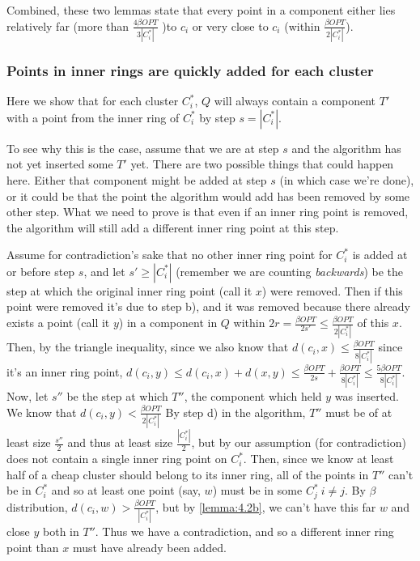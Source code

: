 \documentclass[paper=a4, fontsize=10.5pt]{scrartcl} %
\numberwithin{equation}{section} %
\numberwithin{figure}{section} %
\numberwithin{table}{section} %
\begin{document}
Combined, these two lemmas state that every point in a component either lies relatively far (more than $\frac{4 \beta OPT}{3 |C^*_i|}$ )to $c_i$ or very close to $c_i$ (within $\frac{\beta OPT}{2 |C^*_i|}$).  


\subsubsection{Points in inner rings are quickly added for each cluster}

Here we show that for each cluster $C^*_i$, $Q$ will always contain a component $T'$ with a point from the inner ring of $C^*_i$ by step $s = |C^*_i|$.

To see why this is the case, assume that we are at step $s$ and the algorithm has not yet inserted some $T'$ yet.  There are two possible things that could happen here.  Either that component might be added at step $s$ (in which case we're done), or it could be that the point the algorithm would add has been removed by some other step.  What we need to prove is that even if an inner ring point is removed, the algorithm will still add a different inner ring point at this step.

Assume for contradiction's sake that no other inner ring point for $C^*_i$ is added at or before step $s$, and let $s' \geq |C^*_i|$ (remember we are counting \emph{backwards}) be the step at which the original inner ring point (call it $x$) were removed.  Then if this point were removed it's due to step b), and it was removed because there already exists a point (call it $y$) in a component in $Q$ within $2r = \frac{\beta OPT}{2s'} \leq \frac{\beta OPT}{2|C^*_i|}$ of this $x$.  Then, by the triangle inequality, since we also know that $d(c_i, x) \leq \frac{\beta OPT}{8 |C^*_i|}$ since it's an inner ring point,  $d(c_i, y) \leq d(c_i, x) + d(x, y) \leq \frac{\beta OPT}{2s} + \frac{\beta OPT}{8 |C^*_i|} \leq \frac{5 \beta OPT}{8 |C^*_i|}$.  Now, let $s''$ be the step at which $T''$, the component which held $y$ was inserted.  We know that $d(c_i, y) < \frac{\beta OPT}{2 |C^*_i|}$   By step d) in the algorithm, $T''$ must be of at least size $\frac{s''}{2}$ and thus at least size $\frac{|C^*_i|}{2}$, but by our assumption (for contradiction) does not contain a single inner ring point on $C^*_i$.  Then, since we know at least half of a cheap cluster should belong to its inner ring, all of the points in $T''$ can't be in $C^*_i$ and so at least one point (say, $w$) must be in some $C^*_j~i \neq j$.  By $\beta$ distribution, $d(c_i, w) > \frac{\beta OPT}{|C^*_i|}$, but by \ref{lemma:4.2b}, we can't have this far $w$ and close $y$ both in $T''$.  Thus we have a contradiction, and so a different inner ring point than $x$ must have already been added.
\end{document}

